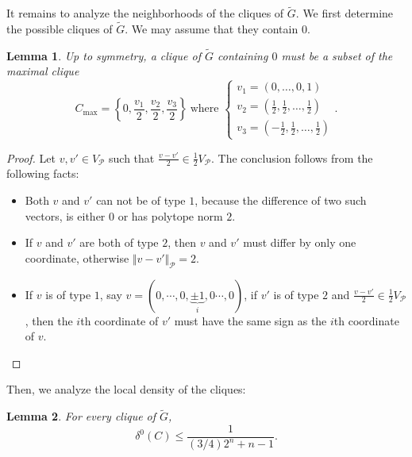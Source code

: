\documentclass{amsart}                     %
\newtheorem{lemm}{Lemma}
\begin{document}
It remains to analyze the neighborhoods of the cliques of $\tilde{G}$. We first determine the possible cliques of $\tilde{G}$. We may assume that they contain $0$.

\begin{lemm} Up to symmetry, a clique of $\tilde{G}$ containing $0$ must be a subset of the maximal clique 
$$ C_{\max} =\left\{ 0, \frac{v_1}{2}, \frac{v_2}{2}, \frac{v_3}{2} \right\} \ \text{where } \begin{cases} v_1=(0,\ldots,0,1) \\ v_2=\left(\frac{1}{2},\frac{1}{2},\ldots,\frac{1}{2}\right) \\ v_3=\left(-\frac{1}{2},\frac{1}{2},\ldots,\frac{1}{2}\right)  \end{cases}.$$
\end{lemm}

\begin{proof}
Let $v,v'\in V_\mathcal{P}$ such that $\frac{v-v'}{2}\in \frac{1}{2}V_\mathcal{P}$. The conclusion follows from 
the following facts:
\begin{itemize}
\item Both $v$ and $v'$ can not be of type $1$, because the difference of two such vectors, is either $0$ or has polytope norm $2$.
\item If $v$ and $v'$ are both of type $2$, then $v$ and $v'$ must differ by only one coordinate, otherwise $\Vert  v-v'\Vert  _\mathcal{P}=2$.
\item If $v$ is of type $1$, say $v=(0,\cdots,0,\underbrace{\pm 1}_i,0\cdots,0)$, if $v'$ is of type $2$ and $\frac{v-v'}{2}\in \frac{1}{2}V_\mathcal{P}$, then the $i$th coordinate of $v'$ must have the same sign as the $i$th coordinate of $v$. 
\end{itemize}
\end{proof}

Then, we analyze  the local density of the  cliques:

\begin{lemm}\label{DnDelta*}
For every clique of $\tilde{G}$,
$$\delta^0(C)\leq \frac 1 {{(3/{4})2^n+n-1}}.$$
\end{lemm}
\end{document}
